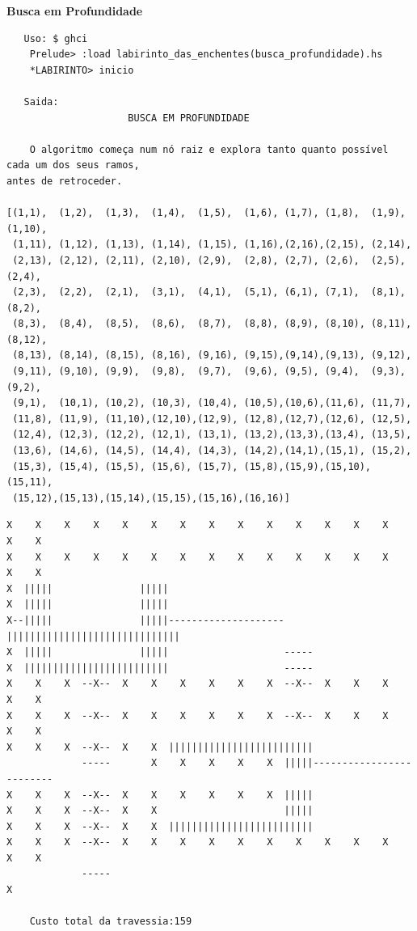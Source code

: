 \documentclass[10pt]{article}
\begin{document}
\vspace{3mm}
\textbf{Busca em Profundidade}
\begin{verbatim}
   Uso: $ ghci
	Prelude> :load labirinto_das_enchentes(busca_profundidade).hs
	*LABIRINTO> inicio

   Saida:
		             BUSCA EM PROFUNDIDADE

	O algoritmo começa num nó raiz e explora tanto quanto possível cada um dos seus ramos, 
antes de retroceder.

[(1,1),  (1,2),  (1,3),  (1,4),  (1,5),  (1,6), (1,7), (1,8),  (1,9), (1,10),
 (1,11), (1,12), (1,13), (1,14), (1,15), (1,16),(2,16),(2,15), (2,14), 
 (2,13), (2,12), (2,11), (2,10), (2,9),  (2,8), (2,7), (2,6),  (2,5), (2,4),
 (2,3),  (2,2),  (2,1),  (3,1),  (4,1),  (5,1), (6,1), (7,1),  (8,1), (8,2), 
 (8,3),  (8,4),  (8,5),  (8,6),  (8,7),  (8,8), (8,9), (8,10), (8,11),(8,12),
 (8,13), (8,14), (8,15), (8,16), (9,16), (9,15),(9,14),(9,13), (9,12), 
 (9,11), (9,10), (9,9),  (9,8),  (9,7),  (9,6), (9,5), (9,4),  (9,3), (9,2),
 (9,1),  (10,1), (10,2), (10,3), (10,4), (10,5),(10,6),(11,6), (11,7),
 (11,8), (11,9), (11,10),(12,10),(12,9), (12,8),(12,7),(12,6), (12,5),
 (12,4), (12,3), (12,2), (12,1), (13,1), (13,2),(13,3),(13,4), (13,5),
 (13,6), (14,6), (14,5), (14,4), (14,3), (14,2),(14,1),(15,1), (15,2),
 (15,3), (15,4), (15,5), (15,6), (15,7), (15,8),(15,9),(15,10),(15,11),
 (15,12),(15,13),(15,14),(15,15),(15,16),(16,16)]

\end{verbatim}

\pagebreak

\begin{verbatim}
X    X    X    X    X    X    X    X    X    X    X    X    X    X    X    X
X    X    X    X    X    X    X    X    X    X    X    X    X    X    X    X
X  |||||               |||||
X  |||||               |||||
X--|||||               |||||--------------------||||||||||||||||||||||||||||||
X  |||||               |||||                    -----
X  |||||||||||||||||||||||||                    -----
X    X    X  --X--  X    X    X    X    X    X  --X--  X    X    X    X    X
X    X    X  --X--  X    X    X    X    X    X  --X--  X    X    X    X    X
X    X    X  --X--  X    X  |||||||||||||||||||||||||
             -----       X    X    X    X    X  |||||-------------------------
X    X    X  --X--  X    X    X    X    X    X  |||||
X    X    X  --X--  X    X                      |||||
X    X    X  --X--  X    X  |||||||||||||||||||||||||
X    X    X  --X--  X    X    X    X    X    X    X    X    X    X    X    X
             -----                                                         X

	Custo total da travessia:159
\end{verbatim}
\end{document}
